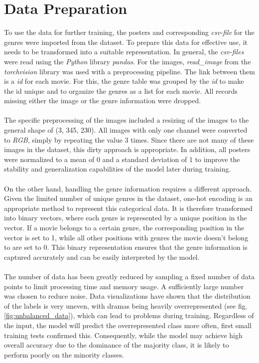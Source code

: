 \documentclass[a4paper, 11pt]{article}
\begin{document}
\section{Data Preparation}
    To use the data for further training, the posters and corresponding \textit{csv-file} for the genres were imported from the dataset. To prepare this data for effective use, it needs to be transformed into a suitable representation. In general, the \textit{csv-files} were read using the \textit{Python} library \textit{pandas}. For the images, \textit{read\_image} from the \textit{torchvision} library was used with a preprocessing pipeline. The link between them is a \textit{id} for each movie. For this, the genre table was grouped by the \textit{id} to make the id unique and to organize the genres as a list for each movie. All records missing either the image or the genre information were dropped.\\\\
    The specific preprocessing of the images included a resizing of the images to the general shape of (3, 345, 230). All images with only one channel were converted to \textit{RGB}, simply by repeating the value 3 times. Since there are not many of these images in the dataset, this dirty approach is appropriate. In addition, all posters were normalized to a mean of 0 and a standard deviation of 1 to improve the stability and generalization capabilities of the model later during training.\\\\
    On the other hand, handling the genre information requires a different approach. Given the limited number of unique genres in the dataset, one-hot encoding is an appropriate method to represent this categorical data. It is therefore transformed into binary vectors, where each genre is represented by a unique position in the vector. If a movie belongs to a certain genre, the corresponding position in the vector is set to 1, while all other positions with genres the movie doesn't belong to are set to 0. This binary representation ensures that the genre information is captured accurately and can be easily interpreted by the model.\\\\
    The number of data has been greatly reduced by sampling a fixed number of data points to limit processing time and memory usage. A sufficiently large number was chosen to reduce noise. 
    Data visualizations have shown that the distribution of the labels is very uneven, with dramas being heavily overrepresented (see fig. \ref{fig:unbalanced_data}), which can lead to problems during training. Regardless of the input, the model will predict the overrepresented class more often, first small training tests confirmed this. Consequently, while the model may achieve high overall accuracy due to the dominance of the majority class, it is likely to perform poorly on the minority classes.
\end{document}
